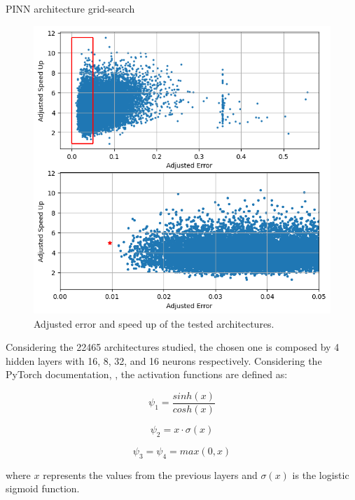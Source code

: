 \documentclass[serif,8pt, aspectratio=169]{beamer}
\begin{document}
    \begin{frame}[fragile]{PINN architecture grid-search}
        \begin{minipage}{0.55\linewidth}
            \begin{figure}
                \centering
                \includegraphics[width=0.85\linewidth]{pic/pinn_selection.png}
                \caption{Adjusted error and speed up of the tested architectures.}
                \label{fig:pinn-selection}
            \end{figure}
        \end{minipage}
        \begin{minipage}{0.44\linewidth}
            Considering the 22465 architectures studied, the chosen one is composed by 4 hidden layers with 16, 8, 32, and 16 neurons respectively. Considering the PyTorch documentation, \cite{pytorch}, the activation functions are defined as:
    
            
            \begin{equation}
                \psi_1= \frac{sinh(x)}{cosh(x)} 
            \end{equation}
    
            \begin{equation}
                \psi_2= x\cdot \sigma(x)
            \end{equation}
    
            \begin{equation}
                \psi_3= \psi_4 = max(0,x)
            \end{equation}
    
            where $x$ represents the values from the previous layers and  $\sigma(x)$ is the logistic sigmoid function.
        \end{minipage}
    \end{frame}
\end{document}
